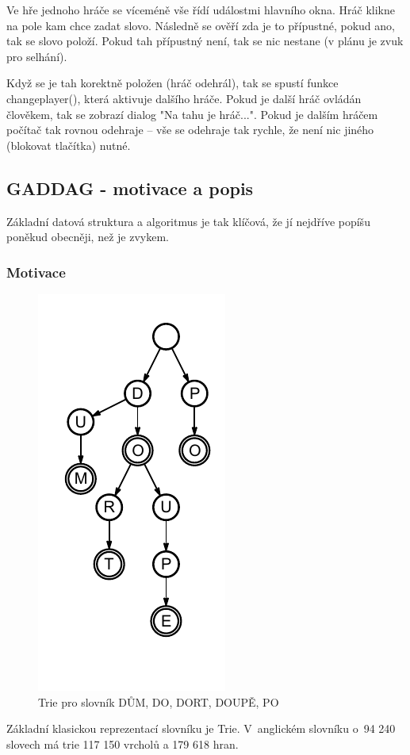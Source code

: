 \documentclass[a4paper]{article}
\begin{document}
Ve hře jednoho hráče se víceméně vše řídí událostmi hlavního okna. Hráč klikne na pole kam chce zadat slovo. Následně se ověří zda je to přípustné, pokud ano, tak se slovo položí. Pokud tah přípustný není, tak se nic nestane (v plánu je zvuk pro selhání). 

Když se je tah korektně položen (hráč odehrál), tak se spustí funkce changeplayer(), která aktivuje dalšího hráče. Pokud je další hráč ovládán člověkem, tak se zobrazí dialog "Na tahu je hráč...". Pokud je dalším hráčem počítač tak rovnou odehraje -- vše se odehraje tak rychle, že není nic jiného (blokovat tlačítka) nutné. 

\subsection{GADDAG - motivace a popis}

Základní datová struktura a algoritmus je tak klíčová, že jí nejdříve popíšu poněkud obecněji, než je zvykem.

\subsubsection{Motivace}\begin{figure}[htb]
\centering
\includegraphics{pic/trie-all.pdf}
\caption{Trie pro slovník DŮM, DO, DORT, DOUPĚ, PO}
\label{trie}
\end{figure}
Základní klasickou reprezentací slovníku je Trie. V~anglickém slovníku o~94 240 slovech má trie 117 150 vrcholů a 179 618 hran. 
\end{document}
